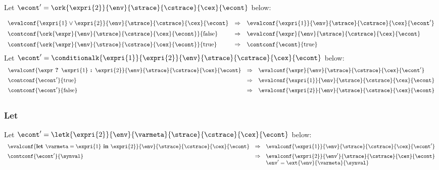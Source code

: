 \documentclass{article}
\begin{document}
\noindent
Let $\econt' = \ork{\expri{2}}{\env}{\strace}{\cstrace}{\cex}{\econt}$ below:

\[
  \begin{array}{lcl}
	\evalconf{\expri{1} \lor \expri{2}}{\env}{\strace}{\cstrace}{\cex}{\econt}
	& \Rightarrow &
	\evalconf{\expri{1}}{\env}{\strace}{\cstrace}{\cex}{\econt'}\\[2mm]

	\contconf{\ork{\expr}{\env}{\strace}{\cstrace}{\cex}{\econt}}{\false}
	& \Rightarrow &
	\evalconf{\expr}{\env}{\strace}{\cstrace}{\cex}{\econt}\\[2mm]

	\contconf{\ork{\expr}{\env}{\strace}{\cstrace}{\cex}{\econt}}{\true}
	& \Rightarrow &
	\contconf{\econt}{\true}\\
  \end{array}
\]
\noindent
Let $\econt' = \conditionalk{\expri{1}}{\expri{2}}{\env}{\strace}{\cstrace}{\cex}{\econt}$ below:
\[
  \begin{array}{lcl}
	\evalconf{\expr \textbf{ ? } \expri{1} \textbf{ : } \expri{2}}{\env}{\strace}{\cstrace}{\cex}{\econt}
	& \Rightarrow &
	\evalconf{\expr}{\env}{\strace}{\cstrace}{\cex}{\econt'}\\[2mm]

	\contconf{\econt'}{\true}
	& \Rightarrow &
	\evalconf{\expri{1}}{\env}{\strace}{\cstrace}{\cex}{\econt}\\[2mm]

	\contconf{\econt'}{\false}
	& \Rightarrow &
	\evalconf{\expri{2}}{\env}{\strace}{\cstrace}{\cex}{\econt}\\[2mm]
  \end{array}
\]

\subsubsection{Let}
Let $\econt' = \letk{\expri{2}}{\env}{\varmeta}{\strace}{\cstrace}{\cex}{\econt}$ below:
\[
  \begin{array}{lcl}
	\evalconf{\textbf{let } \varmeta = \expri{1} \textbf{ in } \expri{2}}{\env}{\strace}{\cstrace}{\cex}{\econt}
	& \Rightarrow &
	\evalconf{\expri{1}}{\env}{\strace}{\cstrace}{\cex}{\econt'}\\[2mm]

	\contconf{\econt'}{\synval}
	& \Rightarrow &
	\evalconf{\expri{2}}{\env'}{\strace}{\cstrace}{\cex}{\econt}\\
	&&\env'=\ext{\env}{\varmeta}{\synval}\\[2mm]

  \end{array}
\]
\end{document}
